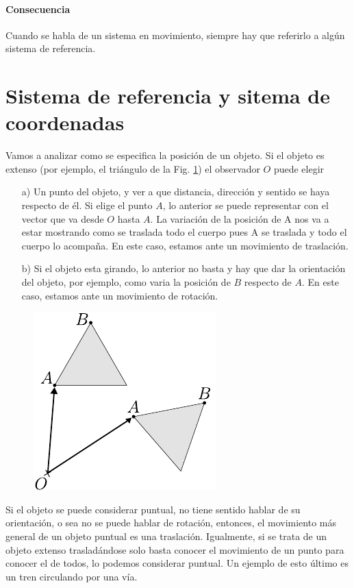 \paragraph*{Consecuencia} Cuando se habla de un sistema en movimiento, siempre hay que 
referirlo a algún sistema de referencia.

\section{Sistema de referencia y sitema de coordenadas}
Vamos a analizar como se especifica la posición de un objeto. Si el objeto es extenso (por ejemplo, el triángulo de la 
Fig. \ref*{fig:1-1}) el observador $O$ puede elegir
\begin{itemize}[noitemsep]
    \item[a)] Un punto del objeto, y ver a que distancia, dirección y sentido se haya respecto de él. Si elige el punto 
    $A$, lo anterior se puede representar con el vector que va desde $O$ hasta $A$. La variación de la posición de A nos 
    va a estar mostrando como se traslada todo el cuerpo pues A se traslada y todo el cuerpo lo acompaña. En este caso, 
    estamos ante un movimiento de traslación.
    \item[b)] Si el objeto esta girando, lo anterior no basta y hay que dar la orientación del objeto, por ejemplo, como 
    varia la posición de $B$ respecto de $A$. En este caso, estamos ante un movimiento de rotación.
\end{itemize}

\begin{figure} 
    \includegraphics[]{images/f1-1.pdf}
    \caption{}
    \label{fig:1-1}
    \vspace{-20pt}
\end{figure}

Si el objeto se puede considerar puntual, no tiene sentido hablar de su orientación, o sea no se puede hablar de 
rotación, entonces, el movimiento más general de un objeto puntual es una traslación. Igualmente, si se trata de un 
objeto extenso trasladándose solo basta conocer el movimiento de un punto para conocer el de todos, lo podemos 
considerar puntual. Un ejemplo de esto último es un tren circulando por una vía.

